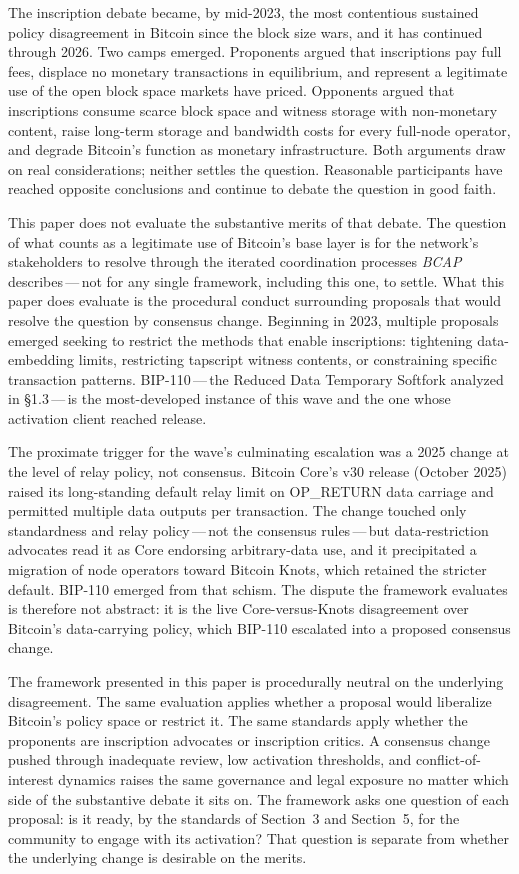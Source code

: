 \documentclass[11pt, twoside, openright]{book}
\newcommand{\sect}[1]{\S#1}
\begin{document}
The inscription debate became, by mid-2023, the most contentious sustained policy disagreement in Bitcoin since the block size wars, and it has continued through 2026. Two camps emerged. Proponents argued that inscriptions pay full fees, displace no monetary transactions in equilibrium, and represent a legitimate use of the open block space markets have priced. Opponents argued that inscriptions consume scarce block space and witness storage with non-monetary content, raise long-term storage and bandwidth costs for every full-node operator, and degrade Bitcoin's function as monetary infrastructure. Both arguments draw on real considerations; neither settles the question. Reasonable participants have reached opposite conclusions and continue to debate the question in good faith.

This paper does not evaluate the substantive merits of that debate. The question of what counts as a legitimate use of Bitcoin's base layer is for the network's stakeholders to resolve through the iterated coordination processes \textit{BCAP} describes\,---\,not for any single framework, including this one, to settle. What this paper does evaluate is the procedural conduct surrounding proposals that would resolve the question by consensus change. Beginning in 2023, multiple proposals emerged seeking to restrict the methods that enable inscriptions: tightening data-embedding limits, restricting tapscript witness contents, or constraining specific transaction patterns. BIP-110\,---\,the Reduced Data Temporary Softfork analyzed in \sect{1.3}\,---\,is the most-developed instance of this wave and the one whose activation client reached release.

The proximate trigger for the wave's culminating escalation was a 2025 change at the level of relay policy, not consensus. Bitcoin Core's v30 release (October 2025) raised its long-standing default relay limit on OP\_RETURN data carriage and permitted multiple data outputs per transaction. The change touched only standardness and relay policy\,---\,not the consensus rules\,---\,but data-restriction advocates read it as Core endorsing arbitrary-data use, and it precipitated a migration of node operators toward Bitcoin Knots, which retained the stricter default. BIP-110 emerged from that schism. The dispute the framework evaluates is therefore not abstract: it is the live Core-versus-Knots disagreement over Bitcoin's data-carrying policy, which BIP-110 escalated into a proposed consensus change.

The framework presented in this paper is procedurally neutral on the underlying disagreement. The same evaluation applies whether a proposal would liberalize Bitcoin's policy space or restrict it. The same standards apply whether the proponents are inscription advocates or inscription critics. A consensus change pushed through inadequate review, low activation thresholds, and conflict-of-interest dynamics raises the same governance and legal exposure no matter which side of the substantive debate it sits on. The framework asks one question of each proposal: is it ready, by the standards of Section~3 and Section~5, for the community to engage with its activation? That question is separate from whether the underlying change is desirable on the merits.
\end{document}
